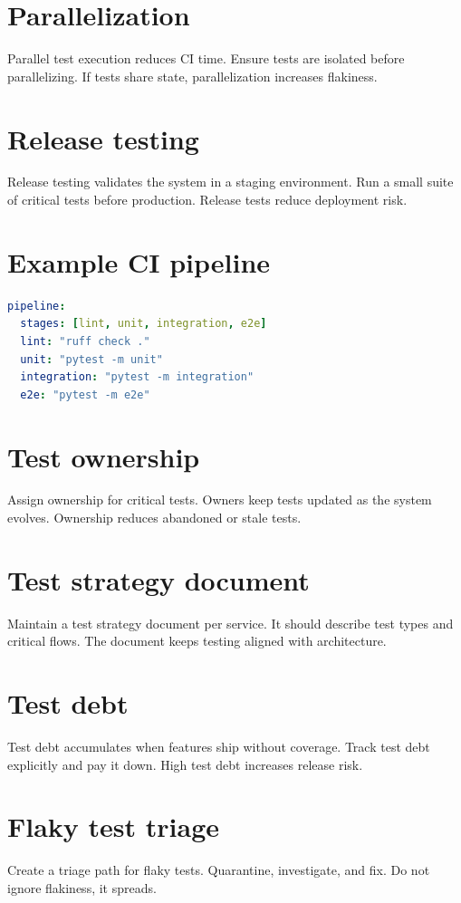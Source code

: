 \section{Parallelization}
Parallel test execution reduces CI time.
Ensure tests are isolated before parallelizing.
If tests share state, parallelization increases flakiness.

\section{Release testing}
Release testing validates the system in a staging environment.
Run a small suite of critical tests before production.
Release tests reduce deployment risk.

\section{Example CI pipeline}
\begin{lstlisting}[language=YAML]
pipeline:
  stages: [lint, unit, integration, e2e]
  lint: "ruff check ."
  unit: "pytest -m unit"
  integration: "pytest -m integration"
  e2e: "pytest -m e2e"
\end{lstlisting}

\section{Test ownership}
Assign ownership for critical tests.
Owners keep tests updated as the system evolves.
Ownership reduces abandoned or stale tests.

\section{Test strategy document}
Maintain a test strategy document per service.
It should describe test types and critical flows.
The document keeps testing aligned with architecture.

\section{Test debt}
Test debt accumulates when features ship without coverage.
Track test debt explicitly and pay it down.
High test debt increases release risk.

\section{Flaky test triage}
Create a triage path for flaky tests.
Quarantine, investigate, and fix.
Do not ignore flakiness, it spreads.

